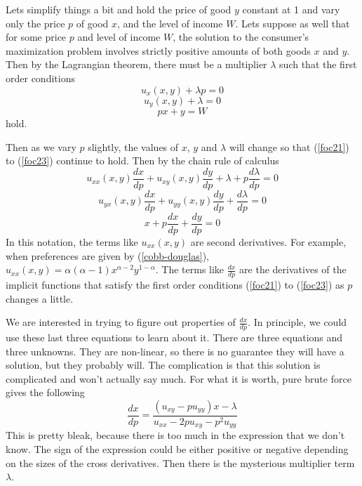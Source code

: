 \documentclass[12pt]{article}
\begin{document}
Lets simplify things a bit and hold the price of good $y$ constant at 1 and
vary only the price $p$ of good $x$, and the level of income $W$. Lets suppose
as well that for some price $p$ and level of income $W$, the solution to the
consumer's maximization problem involves strictly positive amounts of both
goods $x$ and $y$. Then by the Lagrangian theorem, there must be a multiplier
$\lambda$ such that the first order conditions
\begin{equation}
  u_x ( x, y ) + \lambda p = 0 \label{foc21}
\end{equation}
\begin{equation}
  u_y ( x, y ) + \lambda = 0 \label{foc22}
\end{equation}
\begin{equation}
  p x + y = W \label{foc23}
\end{equation}
hold.

Then as we vary $p$ slightly, the values of $x$, $y$ and $\lambda$ will change
so that (\ref{foc21}) to (\ref{foc23}) continue to hold. Then by the chain
rule of calculus
\begin{equation}
  u_{x x} ( x, y ) \frac{d x}{d p} + u_{x y} ( x, y ) \frac{d y}{d p} +
  \lambda + p \frac{d \lambda}{d p} = 0
\end{equation}
\begin{equation}
  u_{y x} ( x, y ) \frac{d x}{d p} + u_{y y} ( x, y ) \frac{d y}{d p} +
  \frac{d \lambda}{d p} = 0
\end{equation}
\begin{equation}
  x + p \frac{d x}{d p} + \frac{d y}{d p} = 0
\end{equation}
In this notation, the terms like $u_{x x} ( x, y )$ are second derivatives.
For example, when preferences are given by (\ref{cobb-douglas}), $u_{x x} ( x,
y ) = \alpha ( \alpha - 1 ) x^{\alpha - 2} y^{1 - \alpha}$. The terms like
$\frac{d x}{d p}$ are the derivatives of the implicit functions that satisfy
the first order conditions (\ref{foc21}) to (\ref{foc23}) as $p$ changes a
little.

We are interested in trying to figure out properties of $\frac{d x}{d p}$. In
principle, we could use these last three equations to learn about it. There
are three equations and three unknowns. They are non-linear, so there is no
guarantee they will have a solution, but they probably will. The complication
is that this solution is complicated and won't actually say much. For what it
is worth, pure brute force gives the following
\begin{equation}
  \frac{d x}{d p} = \frac{( u_{x y} - p u_{y y} ) x - \lambda}{u_{x x} - 2 p
  u_{x y} - p^2 u_{y y}} \label{cs}
\end{equation}
This is pretty bleak, because there is too much in the expression that we
don't know. The sign of the expression could be either positive or negative
depending on the sizes of the cross derivatives. Then there is the mysterious
multiplier term $\lambda$.
\end{document}
